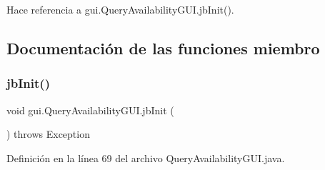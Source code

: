 Hace referencia a gui.\+Query\+Availability\+G\+U\+I.\+jb\+Init().



\subsection{Documentación de las funciones miembro}
\mbox{\label{classgui_1_1_query_availability_g_u_i_aa5bad8dc44ac91fcd6b5f2b784c66e99}} 
\subsubsection{\texorpdfstring{jbInit()}{jbInit()}}
{\footnotesize\ttfamily void gui.\+Query\+Availability\+G\+U\+I.\+jb\+Init (\begin{DoxyParamCaption}{ }\end{DoxyParamCaption}) throws Exception\hspace{0.3cm}{\ttfamily [private]}}



Definición en la línea 69 del archivo Query\+Availability\+G\+U\+I.\+java.


